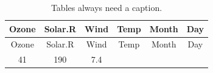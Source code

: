 \documentclass[]{article}
\theoremstyle{definition}
\theoremstyle{definition}
\theoremstyle{definition}
\theoremstyle{remark}
\begin{document}
\begin{longtable}[]{@{}cccccc@{}}
\caption{Tables always need a caption.}\tabularnewline
\toprule
\begin{minipage}[b]{0.09\columnwidth}\centering\strut
Ozone\strut
\end{minipage} & \begin{minipage}[b]{0.12\columnwidth}\centering\strut
Solar.R\strut
\end{minipage} & \begin{minipage}[b]{0.08\columnwidth}\centering\strut
Wind\strut
\end{minipage} & \begin{minipage}[b]{0.08\columnwidth}\centering\strut
Temp\strut
\end{minipage} & \begin{minipage}[b]{0.09\columnwidth}\centering\strut
Month\strut
\end{minipage} & \begin{minipage}[b]{0.06\columnwidth}\centering\strut
Day\strut
\end{minipage}\tabularnewline
\midrule
\endfirsthead
\toprule
\begin{minipage}[b]{0.09\columnwidth}\centering\strut
Ozone\strut
\end{minipage} & \begin{minipage}[b]{0.12\columnwidth}\centering\strut
Solar.R\strut
\end{minipage} & \begin{minipage}[b]{0.08\columnwidth}\centering\strut
Wind\strut
\end{minipage} & \begin{minipage}[b]{0.08\columnwidth}\centering\strut
Temp\strut
\end{minipage} & \begin{minipage}[b]{0.09\columnwidth}\centering\strut
Month\strut
\end{minipage} & \begin{minipage}[b]{0.06\columnwidth}\centering\strut
Day\strut
\end{minipage}\tabularnewline
\midrule
\endhead
\begin{minipage}[t]{0.09\columnwidth}\centering\strut
41\strut
\end{minipage} & \begin{minipage}[t]{0.12\columnwidth}\centering\strut
190\strut
\end{minipage} & \begin{minipage}[t]{0.08\columnwidth}\centering\strut
7.4\strut
\end{minipage} & \begin{minipage}[t]{0.08\columnwidth}\centering\strut

\end{minipage}
\end{longtable}
\end{document}
